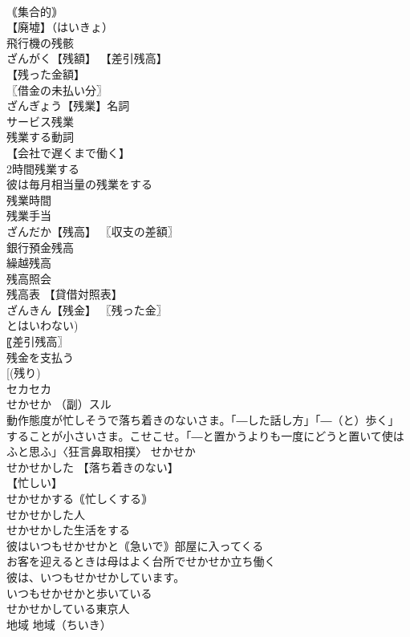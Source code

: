 \documentclass[8pt]{extreport}
\begin{document}
\begin{CJK}{UTF8}{min}
\\	｟集合的｠ 
\\	【廃墟】（はいきょ）
\\	飛行機の残骸 
\\	ざんがく【残額】 【差引残高】
\\	【残った金額】
\\	〖借金の未払い分〗
\\	ざんぎょう【残業】名詞 
\\	サービス残業 
\\	残業する動詞 
\\	【会社で遅くまで働く】
\\	2時間残業する 
\\	彼は毎月相当量の残業をする 
\\	残業時間 
\\	残業手当 
\\	ざんだか【残高】 〖収支の差額〗
\\	銀行預金残高 
\\	繰越残高 
\\	残高照会 
\\	残高表 【貸借対照表】
\\	ざんきん【残金】 〖残った金〗
\\	とはいわない) 
\\	〖差引残高〗
\\	残金を支払う 
\\	[(残り) 
\\	セカセカ		
\\	せかせか （副）スル 
\\	動作態度が忙しそうで落ち着きのないさま。「―した話し方」「―（と）歩く」 
\\	することが小さいさま。こせこせ。「―と置かうよりも一度にどうと置いて使はふと思ふ」〈狂言鼻取相撲〉 せかせか 
\\	せかせかした 【落ち着きのない】
\\	【忙しい】
\\	せかせかする｟忙しくする｠ 
\\	せかせかした人 
\\	せかせかした生活をする 
\\	彼はいつもせかせかと｟急いで｠部屋に入ってくる 
\\	お客を迎えるときは母はよく台所でせかせか立ち働く 
\\	彼は、いつもせかせかしています。 
\\	いつもせかせかと歩いている 
\\	せかせかしている東京人 
\\	地域		地域（ちいき） 

\end{CJK}
\end{document}
